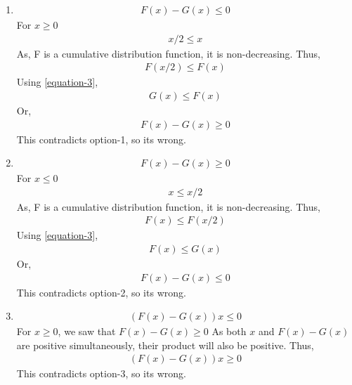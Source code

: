 \documentclass[journal,12pt,twocolumn]{IEEEtran}
\begin{document}
\begin{enumerate}
    \item \begin{align}
              F(x)-G(x) \leq 0
          \end{align}
          For $x \geq 0$
          \begin{align}
              x/2 \leq x
          \end{align}
          As, F is a cumulative distribution function, it is non-decreasing.
          Thus,
          \begin{align}
              F(x/2) \leq F(x)
          \end{align}
          Using \ref{equation-3},
          \begin{align}
              G(x) \leq F(x)
          \end{align}
          Or,
          \begin{align} \label{equation-4}
              F(x)-G(x) \geq 0         
          \end{align}
          This contradicts option-1, so its wrong.
    \item \begin{align}
              F(x)-G(x) \geq 0
          \end{align}
          For $x \leq 0$
          \begin{align}
              x \leq x/2
          \end{align}
          As, F is a cumulative distribution function, it is non-decreasing.
          Thus,
          \begin{align}
              F(x) \leq F(x/2)
          \end{align}
          Using \ref{equation-3},
          \begin{align}
              F(x) \leq G(x)
          \end{align}
          Or,
          \begin{align}
              F(x)-G(x) \leq 0
          \end{align}
          This contradicts option-2, so its wrong.
    \item \begin{align}
              (F(x)-G(x))x \leq 0
          \end{align}
          For $x \geq 0$, we saw that $F(x)-G(x) \geq 0$
          As both $x$ and $F(x)-G(x)$ are positive simultaneously, their product will also be positive. Thus,
          \begin{align}
              (F(x)-G(x))x \geq 0
          \end{align}
          This contradicts option-3, so its wrong.


\end{enumerate}
\end{document}
